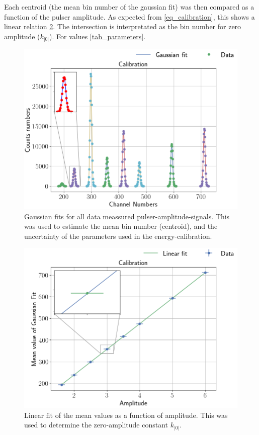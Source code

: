Each centroid (the mean bin number of the gaussian fit) was then compared as a
function of the pulser amplitude. As expected from \cref{eq_calibration}, this
shows a linear relation \cref{fig_linear_fit}.
The intersection is interpretated as the bin number for zero amplitude ($k_|0|$).
For values \cref{tab_parameters}.

\begin{figure}[t]
\centering
\includegraphics[width=0.99\columnwidth]{gaussian_fit}
\caption{Gaussian fits for all data meassured pulser-amplitude-signals. This was used to estimate the mean
bin number (centroid), and the uncertainty of the parameters used in the
energy-calibration.}
\label{fig_gaussian_fit}
\end{figure}

\begin{figure}[t]
\centering
\includegraphics[width=0.99\columnwidth]{k0_plotting}
\caption{Linear fit of the mean values as a function of amplitude. This was
used to determine the zero-amplitude constant $k_|0|$.}
\label{fig_linear_fit}
\end{figure}

